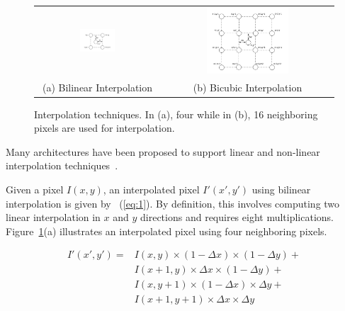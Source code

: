 \begin{figure}[!htb]
\centering
\begin{tabular}{@{}c@{} @{}c@{}}
\includegraphics[width=0.3\textwidth]{./figures/bilinear.pdf} & \includegraphics[width=0.5\textwidth]{./figures/bicubic.pdf}\\[\abovecaptionskip]
\small (a) Bilinear Interpolation & \small (b) Bicubic Interpolation
\end{tabular}
\vspace{1pt}
\caption{Interpolation techniques. In (a), four while in (b), 16 neighboring pixels are used for interpolation.}
\label{tab:interpolation}
\end{figure}

Many architectures have been proposed to support linear 
and non-linear interpolation techniques~\cite{kesturdac}.

Given a pixel $I(x,y)$, an interpolated pixel $I'(x',y')$ using bilinear interpolation is given by ~(\ref{eq:1}). By definition, 
this involves computing two linear interpolation in $x$ and $y$ directions and requires eight multiplications. 
Figure~\ref{tab:interpolation}(a) illustrates an interpolated pixel using four neighboring pixels.

\begin{equation}
\begin{split}
I'(x',y') = &I(x,y) \times (1-\Delta x) \times (1-\Delta y) +\\ 
            &I(x+1,y) \times\Delta x \times (1-\Delta y) +\\ 
            &I(x,y+1) \times (1-\Delta x) \times\Delta y +\\ 
            &I(x+1,y+1) \times\Delta x \times\Delta y 
\end{split}
\label{eq:1}
\end{equation}

